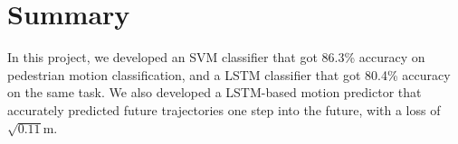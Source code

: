 \section{Summary} \label{sec:summary}

In this project, we developed an SVM classifier that got 86.3\% accuracy on pedestrian motion classification, and a LSTM classifier that got 80.4\% accuracy on the same task.
We also developed a LSTM-based motion predictor that accurately predicted future trajectories one step into the future, with a loss of $\sqrt{0.11}$m.
